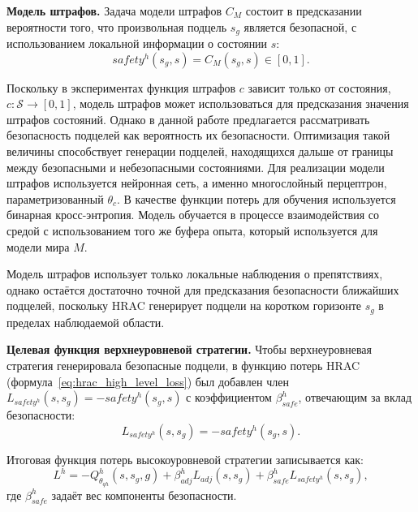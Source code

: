 \textbf{Модель штрафов.} Задача модели штрафов $C_M$ состоит в предсказании вероятности того, что произвольная подцель $s_g$ является безопасной, с использованием локальной информации о состоянии $s$:
\begin{equation}
    \label{eq:ites_high_level_safety}
    safety^h(s_g,s)
    =
    C_M(s_g,s)
    \in [0,1].
\end{equation}

Поскольку в экспериментах функция штрафов $c$ зависит только от состояния, $c:\mathcal{S}\rightarrow[0,1]$, модель штрафов может использоваться для предсказания значения штрафов состояний. Однако в данной работе предлагается рассматривать безопасность подцелей как вероятность их безопасности. Оптимизация такой величины способствует генерации подцелей, находящихся дальше от границы между безопасными и небезопасными состояниями. Для реализации модели штрафов используется нейронная сеть, а именно многослойный перцептрон, параметризованный $\theta_c$. В качестве функции потерь для обучения используется бинарная кросс-энтропия. Модель обучается в процессе взаимодействия со средой с использованием того же буфера опыта, который используется для модели мира $M$.

Модель штрафов использует только локальные наблюдения о препятствиях, однако остаётся достаточно точной для предсказания безопасности ближайших подцелей, поскольку HRAC генерирует подцели на коротком горизонте $s_g$ в пределах наблюдаемой области.

\textbf{Целевая функция верхнеуровневой стратегии.} Чтобы верхнеуровневая стратегия генерировала безопасные подцели, в функцию потерь HRAC (формула~\ref{eq:hrac_high_level_loss}) был добавлен член $L_{safety^h}(s, s_g)=-safety^h(s_g, s)$ с коэффициентом $\beta^h_{safe}$, отвечающим за вклад безопасности:
\begin{equation}
    \label{eq:ites_high_level_safety_loss}
    L_{safety^h}(s,s_g)
    =
    -safety^h(s_g,s).
\end{equation}

Итоговая функция потерь высокоуровневой стратегии записывается как:
\begin{equation}
    \label{eq:ites_safe_manager}
    L^h
    =
    -Q^h_{\theta_{qh}}(s,s_g,g)
    +
    \beta^h_{adj} L_{adj}(s,s_g)
    +
    \beta^h_{safe} L_{safety^h}(s,s_g),
\end{equation}
где $\beta^h_{safe}$ задаёт вес компоненты безопасности.

